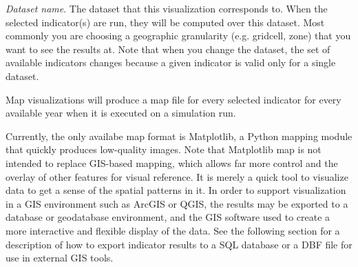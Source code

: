 \emph{Dataset name}. The dataset that this visualization corresponds
to. When the selected indicator(s) are run, they will be computed over
this dataset. Most commonly you are choosing a geographic granularity
(e.g. gridcell, zone) that you want to see the results at. Note that
when you change the dataset, the set of available indicators changes
because a given indicator is valid only for a single dataset.


Map visualizations will produce a map file for every selected
indicator for every available year when it is executed on a
simulation run. 

Currently, the only availabe map format is Matplotlib, a Python mapping
module that quickly produces low-quality images. Note that Matplotlib
map is not intended to replace GIS-based mapping, which allows far more
control and the overlay of other features for visual reference.  It is
merely a quick tool to visualize data to get a sense of the spatial
patterns in it. In order to support visualization in a GIS environment
such as ArcGIS or QGIS, the results may be exported to a database or
geodatabase environment, and the GIS software used to create a more
interactive and flexible display of the data. See the following section
for a description of how to export indicator results to a SQL database
or a DBF file for use in external GIS tools.


